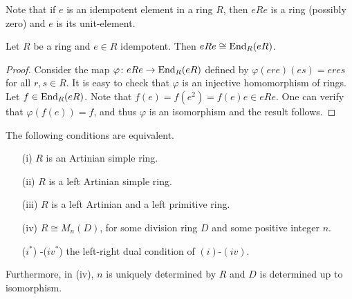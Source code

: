 Note that if $e$ is an idempotent element in a ring $R$, then
$eRe$ is a ring (possibly zero) and $e$ is its unit-element.

\begin{lemma}\label{Lema 1.4.2}
Let $R$ be a ring and $e\in R$ idempotent. Then $eRe\cong
\operatorname{End}_R(eR)$.
\end{lemma}

\begin{proof}
Consider the map $\varphi\colon eRe\rightarrow \operatorname{End}_R(eR)$ defined by  $\varphi
(ere)(es)=eres$ for all $r,s\in R$. It is easy to check that $\varphi$ is an injective homomorphism of rings.
Let $f\in \operatorname{End}_R(eR)$. Note that $f(e)=f(e^2)=f(e)e\in
eRe$. One can verify that $\varphi (f(e))=f$, and thus $\varphi$
is an isomorphism and the result follows.
\end{proof}

\begin{theorem}
\label{Teorema 1.4.3}
The following conditions are equivalent.
\begin{itemize}\item[(i)] $R$ is an Artinian simple ring.
\item[(ii)] $R$ is a left Artinian simple ring.
\item[(iii)] $R$ is a left Artinian and a left primitive ring.
\item[(iv)] $R\cong M_n(D)$, for some division ring $D$ and some positive integer $n$.
\item[($i^*$)]-($iv^*$) the left-right dual condition of $(i)$-$(iv)$.
\end{itemize}
Furthermore, in (iv),  $n$ is uniquely determined by $R$ and $D$ is determined up to isomorphism.
\end{theorem}

